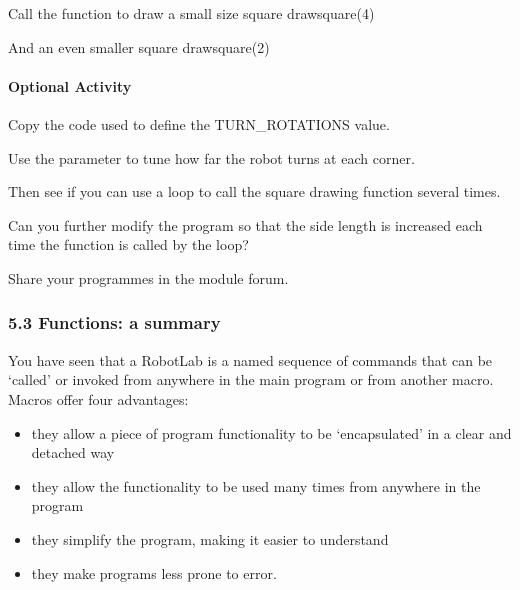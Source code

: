 \documentclass[letterpaper,10pt,english]{sphinxmanual}
\begin{document}
{{\begin{sphinxVerbatim}[commandchars=\\\{\}]
\PYGZsh{} Call the function to draw a small size square
draw\PYGZus{}square(4)

\PYGZsh{} And an even smaller square
draw\PYGZus{}square(2)
\end{sphinxVerbatim}
}


\paragraph{Optional Activity}
\label{\detokenize{content/03_Robot_Lab/Section_00_05:Optional-Activity}}
Copy the code used to define the TURN\_ROTATIONS\textasciigrave{} value.

Use the  parameter to tune how far the robot turns at each corner.

Then see if you can use a  loop to call the square drawing function several times.

Can you further modify the program so that the side length is increased each time the function is called by the loop?

Share your programmes in the module forum.


\subsubsection{5.3 Functions: a summary}
\label{\detokenize{content/03_Robot_Lab/Section_00_05:5.3-Functions:-a-summary}}
You have seen that a RobotLab  is a named sequence of commands that can be ‘called’ or invoked from anywhere in the main program or from another macro. Macros offer four advantages:
\begin{itemize}
\item {} 
they allow a piece of program functionality to be ‘encapsulated’ in a clear and detached way

\item {} 
they allow the functionality to be used many times from anywhere in the program

\item {} 
they simplify the program, making it easier to understand

\item {} 
they make programs less prone to error.

\end{itemize}

}
\end{document}
